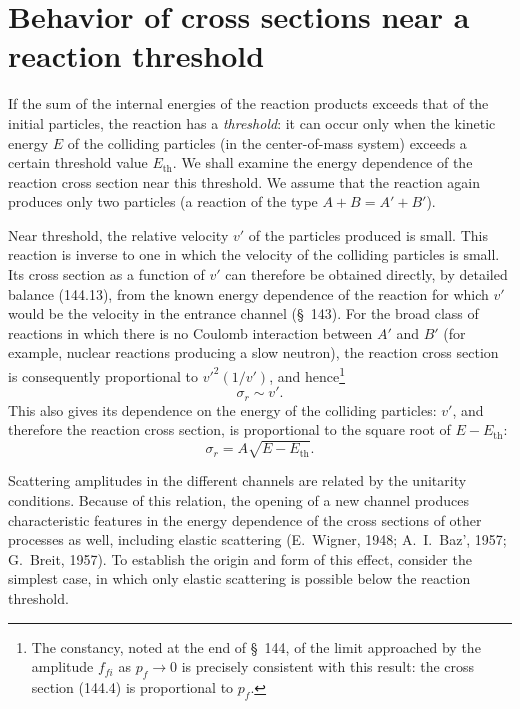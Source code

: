 \section{Behavior of cross sections near a reaction threshold}

If the sum of the internal energies of the reaction products exceeds that of the initial particles, the reaction has a \emph{threshold}: it can occur only when the kinetic energy $E$ of the colliding particles (in the center-of-mass system) exceeds a certain threshold value $E_{\mathrm{th}}$. We shall examine the energy dependence of the reaction cross section near this threshold. We assume that the reaction again produces only two particles (a reaction of the type $A+B=A'+B'$).

Near threshold, the relative velocity $v'$ of the particles produced is small. This reaction is inverse to one in which the velocity of the colliding particles is small. Its cross section as a function of $v'$ can therefore be obtained directly, by detailed balance (144.13), from the known energy dependence of the reaction for which $v'$ would be the velocity in the entrance channel (\S~143). For the broad class of reactions in which there is no Coulomb interaction between $A'$ and $B'$ (for example, nuclear reactions producing a slow neutron), the reaction cross section is consequently proportional to $v'^2(1/v')$, and hence\footnote{The constancy, noted at the end of \S~144, of the limit approached by the amplitude $f_{fi}$ as $p_f\to0$ is precisely consistent with this result: the cross section (144.4) is proportional to $p_f$.}
\begin{equation}
 \sigma_r\sim v'.
 \tag{147.1}
\end{equation}
This also gives its dependence on the energy of the colliding particles: $v'$, and therefore the reaction cross section, is proportional to the square root of $E-E_{\mathrm{th}}$:
\begin{equation}
 \sigma_r=A\sqrt{E-E_{\mathrm{th}}}.
 \tag{147.2}
\end{equation}

Scattering amplitudes in the different channels are related by the unitarity conditions. Because of this relation, the opening of a new channel produces characteristic features in the energy dependence of the cross sections of other processes as well, including elastic scattering (E.~Wigner, 1948; A.~I.~Baz', 1957; G.~Breit, 1957). To establish the origin and form of this effect, consider the simplest case, in which only elastic scattering is possible below the reaction threshold.

